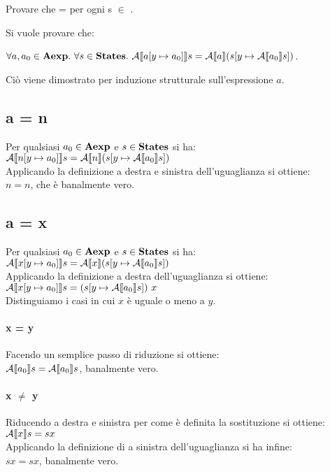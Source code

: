 {
	Provare che
	 =
	 per ogni s $\in$
	\states.
}
{
Si vuole provare che:

$\forall{a,a_0} \in \textbf{Aexp}.\mbox{ }
\forall{s} \in \textbf{States}.\mbox{ }
\mathcal{A} \llbracket a [y \mapsto{} a_0] \rrbracket s =
\mathcal{A} \llbracket a \rrbracket (s [y \mapsto{} \mathcal{A} \llbracket a_0 \rrbracket s])$.

Ciò viene dimostrato per induzione strutturale sull'espressione $a$.

\subsection{a = n} Per qualsiasi $a_0 \in \textbf{Aexp}$ e $s \in \textbf{States}$ si ha:
\\

$\mathcal{A} \llbracket n [y \mapsto{} a_0] \rrbracket s = \mathcal{A} \llbracket n \rrbracket (s [y \mapsto{} \mathcal{A} \llbracket a_0 \rrbracket s]) $
\\

Applicando la definizione  a destra e sinistra dell'uguaglianza si ottiene:
\\

$n = n$, che è banalmente vero.

\subsection{a = x} Per qualsiasi $a_0 \in \textbf{Aexp}$ e $s \in \textbf{States}$ si ha:
\\

$\mathcal{A} \llbracket x [y \mapsto{} a_0] \rrbracket s = \mathcal{A} \llbracket x \rrbracket (s [y \mapsto{} \mathcal{A} \llbracket a_0 \rrbracket s]) $
\\

Applicando la definizione  a destra dell'uguaglianza si ottiene:
\\

$\mathcal{A} \llbracket x [y \mapsto{} a_0] \rrbracket s = (s [y \mapsto{} \mathcal{A} \llbracket a_0 \rrbracket s]) \mbox{ } x $
\\

Distinguiamo i casi in cui $x$ è uguale o meno a $y$.

\paragraph{x = y} Facendo un semplice passo di riduzione si ottiene:
\\

$\mathcal{A} \llbracket a_0 \rrbracket s = \mathcal{A} \llbracket a_0 \rrbracket s$,
banalmente vero.

\paragraph{x $\neq$ y} Riducendo a destra e sinistra per come è definita la
sostituzione si ottiene:
\\

$\mathcal{A} \llbracket x \rrbracket s = s x$
\\

Applicando la definizione di  a sinistra dell'uguaglianza si ha infine:
\\

$s x = s x$,
banalmente vero.

}

